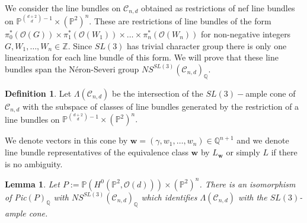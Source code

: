 \documentclass{amsart}
\newcommand{\Z}{\mathbb{Z}}
\newcommand{\Q}{\mathbb{Q}}
\newcommand{\Pj}{\mathbb{P}}
\newcommand{\mc}{\mathcal}
\numberwithin{equation}{section}
\newtheorem{lemma}[prop]{Lemma}
\theoremstyle{definition}
\newtheorem{defn}[prop]{Definition}
\begin{document}
We consider the line bundles on $\mc{C}_{n,d}$ obtained as restrictions of nef line bundles on $\Pj^{\binom{d+2}{d}-1} \times (\Pj^2)^n.$ These are restrictions of line bundles of the form $\pi_0^*(\mc{O}(G)) \times \pi_1^*(\mc{O}(W_1)) \times \dots \times \pi_n^*(\mc{O}(W_n))$ for non-negative integers $G, W_1, \dots , W_n \in \Z$. Since $SL(3)$ has trivial character group there is only one linearization for each line bundle of this form. We will prove that these line bundles span the N\'eron-Severi group $NS^{SL(3)}(\mc{C}_{n,d})_\Q$.

\begin{defn}
    Let $\Lambda(\mc{C}_{n,d})$ be the intersection of the $SL(3)-$ample cone of $\mc{C}_{n,d}$ with the subspace of classes of line bundles generated by the restriction of a line bundles on $\Pj^{\binom{d+2}{d}-1} \times (\Pj^2)^n.$ 
\end{defn}


We denote vectors in this cone by $\mathbf{w} = (\gamma, w_1, \dots , w_n) \in \Q^{n+1}$ and we denote line bundle representatives of the equivalence class $\mathbf{w}$ by $L_{\mathbf{w}}$ or simply $L$ if there is no ambiguity. 

\begin{lemma} \label{lemma:Lambda}
    Let $P:= \Pj (H^0(\Pj^2, \mc{O}(d))) \times (\Pj^2)^n$. There is an isomorphism of \textup{Pic}$(P)_\Q$ with $NS^{SL(3)}(\mc{C}_{n,d})_\Q$ which identifies
    $\Lambda(\mc{C}_{n,d})$ with the $SL(3)$-ample cone.
\end{lemma}
\end{document}
